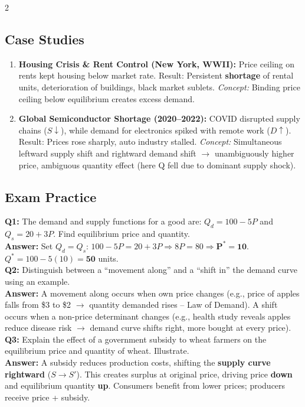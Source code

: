 \documentclass[10pt,a4paper]{article}
\begin{document}
\begin{multicols}{2}
\subsection*{Case Studies}
\begin{enumerate}[leftmargin=*,nosep]
    \item \textbf{Housing Crisis \& Rent Control (New York, WWII):} Price ceiling on rents kept housing below market rate. Result: Persistent \textbf{shortage} of rental units, deterioration of buildings, black market sublets. \textit{Concept:} Binding price ceiling below equilibrium creates excess demand.
    \item \textbf{Global Semiconductor Shortage (2020--2022):} COVID disrupted supply chains ($S \downarrow$), while demand for electronics spiked with remote work ($D \uparrow$). Result: Prices rose sharply, auto industry stalled. \textit{Concept:} Simultaneous leftward supply shift and rightward demand shift $\to$ unambiguously higher price, ambiguous quantity effect (here Q fell due to dominant supply shock).
\end{enumerate}

\subsection*{Exam Practice}
\textbf{Q1:} The demand and supply functions for a good are: $Q_d = 100 - 5P$ and $Q_s = 20 + 3P$. Find equilibrium price and quantity.\\[0.1cm]
\textbf{Answer:} Set $Q_d = Q_s$: $100 - 5P = 20 + 3P \Rightarrow 8P = 80 \Rightarrow \mathbf{P^* = 10}$. $Q^* = 100 - 5(10) = \mathbf{50}$ units.\\[0.2cm]

\textbf{Q2:} Distinguish between a ``movement along'' and a ``shift in'' the demand curve using an example.\\[0.1cm]
\textbf{Answer:} A movement along occurs when own price changes (e.g., price of apples falls from \$3 to \$2 $\to$ quantity demanded rises -- Law of Demand). A shift occurs when a non-price determinant changes (e.g., health study reveals apples reduce disease risk $\to$ demand curve shifts right, more bought at every price).\\[0.2cm]

\textbf{Q3:} Explain the effect of a government subsidy to wheat farmers on the equilibrium price and quantity of wheat. Illustrate.\\[0.1cm]
\textbf{Answer:} A subsidy reduces production costs, shifting the \textbf{supply curve rightward} ($S \to S'$). This creates surplus at original price, driving price \textbf{down} and equilibrium quantity \textbf{up}. Consumers benefit from lower prices; producers receive price + subsidy.
\end{multicols}
\end{document}
